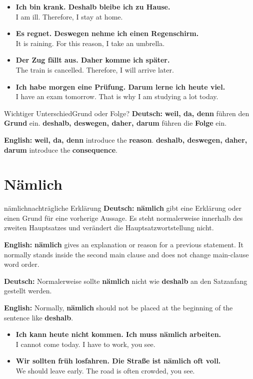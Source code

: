 \documentclass[a4paper,11pt]{article}
\newcommand{\GermanText}[1]{\textbf{Deutsch: }#1\par}
\newcommand{\EnglishText}[1]{{\small\color{SoftGray}\textbf{English: }#1\par}}
\newcommand{\ExampleItem}[2]{\item \textbf{#1}\\{\small\color{SoftGray}#2}}
\begin{document}
        \begin{exbox}
            \begin{itemize}
                \ExampleItem{Ich bin krank. Deshalb bleibe ich zu Hause.}{I am ill. Therefore, I stay at home.}
                \ExampleItem{Es regnet. Deswegen nehme ich einen Regenschirm.}{It is raining. For this reason, I take an umbrella.}
                \ExampleItem{Der Zug fällt aus. Daher komme ich später.}{The train is cancelled. Therefore, I will arrive later.}
                \ExampleItem{Ich habe morgen eine Prüfung. Darum lerne ich heute viel.}{I have an exam tomorrow. That is why I am studying a lot today.}
            \end{itemize}
        \end{exbox}

        \begin{grammarentry}{Wichtiger Unterschied}{Grund oder Folge?}
            \GermanText{\textbf{weil, da, denn} führen den \textbf{Grund} ein. \textbf{deshalb, deswegen, daher, darum} führen die \textbf{Folge} ein.}
            \EnglishText{\textbf{weil, da, denn} introduce the \textbf{reason}. \textbf{deshalb, deswegen, daher, darum} introduce the \textbf{consequence}.}
        \end{grammarentry}

    \section{Nämlich}

        \begin{grammarentry}{nämlich}{nachträgliche Erklärung}
            \GermanText{\textbf{nämlich} gibt eine Erklärung oder einen Grund für eine vorherige Aussage. Es steht normalerweise innerhalb des zweiten Hauptsatzes und verändert die Hauptsatzwortstellung nicht.}
            \EnglishText{\textbf{nämlich} gives an explanation or reason for a previous statement. It normally stands inside the second main clause and does not change main-clause word order.}

            \GermanText{Normalerweise sollte \textbf{nämlich} nicht wie \textbf{deshalb} an den Satzanfang gestellt werden.}
            \EnglishText{Normally, \textbf{nämlich} should not be placed at the beginning of the sentence like \textbf{deshalb}.}
        \end{grammarentry}

        \begin{exbox}
            \begin{itemize}
                \ExampleItem{Ich kann heute nicht kommen. Ich muss nämlich arbeiten.}{I cannot come today. I have to work, you see.}
                \ExampleItem{Wir sollten früh losfahren. Die Straße ist nämlich oft voll.}{We should leave early. The road is often crowded, you see.}
            \end{itemize}
        \end{exbox}
\end{document}
